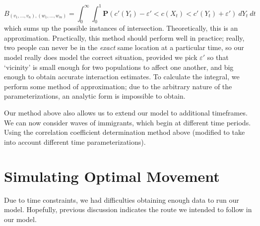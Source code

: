 \documentclass{article}
\begin{document}
%
\[ B_{(v_1, \dots, v_n), (w_1, \dots, w_m)} = \int_0^\infty \int_0^1 \mathbf{P}\left(c'(Y_t) - \varepsilon' < c(X_t) < c'(Y_t) + \varepsilon'\right)\ dY_t\ dt \]
%
which sums up the possible instances of intersection. Theoretically, this is an approximation. Practically, this method should perform well in practice; really, two people can never be in the {\it exact} same location at a particular time, so our model really does model the correct situation, provided we pick $\varepsilon'$ so that `vicinity' is small enough for two populations to affect one another, and big enough to obtain accurate interaction estimates. To calculate the integral, we perform some method of approximation; due to the arbitrary nature of the parameterizations, an analytic form is impossible to obtain.

Our method above also allows us to extend our model to additional timeframes. We can now consider waves of immigrants, which begin at different time periods. Using the correlation coefficient determination method above (modified to take into account different time parameterizations).

\section{Simulating Optimal Movement}

Due to time constraints, we had difficulties obtaining enough data to run our model. Hopefully, previous discussion indicates the route we intended to follow in our model.



\end{document}
